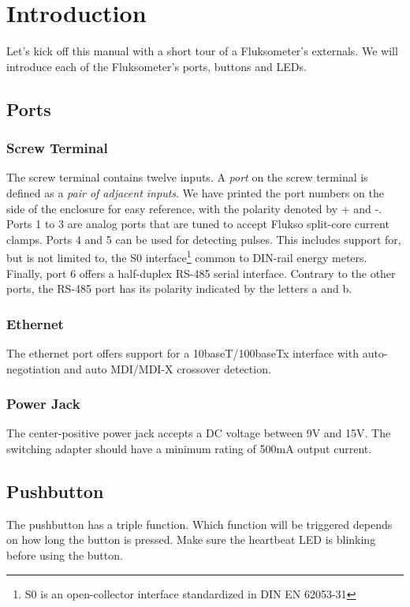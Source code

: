 \chapter{Introduction}

Let's kick off this manual with a short tour of a Fluksometer's externals. We will introduce each of the Fluksometer's ports, buttons and LEDs. 

\section{Ports}

\subsection{Screw Terminal}
\label{sec:introduction_ports_screw}
The screw terminal contains twelve inputs. A \emph{port} on the screw terminal is defined as a \emph{pair of adjacent inputs}. We have printed the port numbers on the side of the enclosure for easy reference, with the polarity denoted by + and -. Ports 1 to 3 are analog ports that are tuned to accept Flukso split-core current clamps. Ports 4 and 5 can be used for detecting pulses. This includes support for, but is not limited to, the S0 interface\footnote{S0 is an open-collector interface standardized in DIN EN 62053-31} common to DIN-rail energy meters. Finally, port 6 offers a half-duplex RS-485 serial interface. Contrary to the other ports, the RS-485 port has its polarity indicated by the letters a and b.

\subsection{Ethernet}
The ethernet port offers support for a 10baseT/100baseTx interface with auto-negotiation and auto MDI/MDI-X crossover detection.

\subsection{Power Jack}
The center-positive power jack accepts a DC voltage between 9V and 15V. The switching adapter should have a minimum rating of 500mA output current.


\section{Pushbutton}
\label{sec:introduction_pushbutton}

The pushbutton has a triple function. Which function will be triggered depends on how long the button is pressed. Make sure the heartbeat LED is blinking before using the button.

